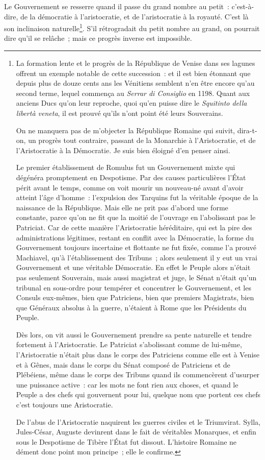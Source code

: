 \documentclass[french,twoside]{book} %
\begin{document}
Le Gouvernement se resserre quand il passe du grand nombre au petit : c’est-à-dire, de la démocratie à l’aristocratie, et de l’aristocratie à la royauté. C’est là son inclinaison naturelle\footnote{ \noindent La formation lente et le progrès de la République de Venise dans ses lagunes offrent un exemple notable de cette succession : et il est bien étonnant que depuis plus de douze cents ans les Vénitiens semblent n’en être encore qu’au second terme, lequel commença au {\itshape Serrar di Consiglio} en 1198. Quant aux anciens Ducs qu’on leur reproche, quoi qu’en puisse dire le {\itshape Squitinto della libertà veneta}, il est prouvé qu’ils n’ont point été leurs Souverains.\par
 On ne manquera pas de m’objecter la République Romaine qui suivit, dira-t-on, un progrès tout contraire, passant de la Monarchie à l’Aristocratie, et de l’Aristocratie à la Démocratie. Je suis bien éloigné d’en penser ainsi.\par
 Le premier établissement de Romulus fut un Gouvernement mixte qui dégénéra promptement en Despotisme. Par des causes particulières l’État périt avant le temps, comme on voit mourir un nouveau-né avant d’avoir atteint l’âge d’homme : l’expulsion des Tarquins fut la véritable époque de la naissance de la République. Mais elle ne prit pas d’abord une forme constante, parce qu’on ne fit que la moitié de l’ouvrage en l’abolissant pas le Patriciat. Car de cette manière l’Aristocratie héréditaire, qui est la pire des administrations légitimes, restant en conflit avec la Démocratie, la forme du Gouvernement toujours incertaine et flottante ne fut fixée, comme l’a prouvé Machiavel, qu’à l’établissement des Tribuns ; alors seulement il y eut un vrai Gouvernement et une véritable Démocratie. En effet le Peuple alors n’était pas seulement Souverain, mais aussi magistrat et juge, le Sénat n’était qu’un tribunal en sous-ordre pour tempérer et concentrer le Gouvernement, et les Consuls eux-mêmes, bien que Patriciens, bien que premiers Magistrats, bien que Généraux absolus à la guerre, n’étaient à Rome que les Présidents du Peuple.\par
 Dès lors, on vit aussi le Gouvernement prendre sa pente naturelle et tendre fortement à l’Aristocratie. Le Patriciat s’abolissant comme de lui-même, l’Aristocratie n’était plus dans le corps des Patriciens comme elle est à Venise et à Gênes, mais dans le corps du Sénat composé de Patriciens et de Plébéiens, même dans le corps des Tribuns quand ils commencèrent d’usurper une puissance active : car les mots ne font rien aux choses, et quand le Peuple a des chefs qui gouvernent pour lui, quelque nom que portent ces chefs c’est toujours une Aristocratie.\par
 De l’abus de l’Aristocratie naquirent les guerres civiles et le Triumvirat. Sylla, Jules-César, Auguste devinrent dans le fait de véritables Monarques, et enfin sous le Despotisme de Tibère l’État fut dissout. L’histoire Romaine ne dément donc point mon principe ; elle le confirme.
 }. S’il rétrogradait du petit nombre au grand, on pourrait dire qu’il se relâche ; mais ce progrès inverse est impossible.\par
\end{document}
